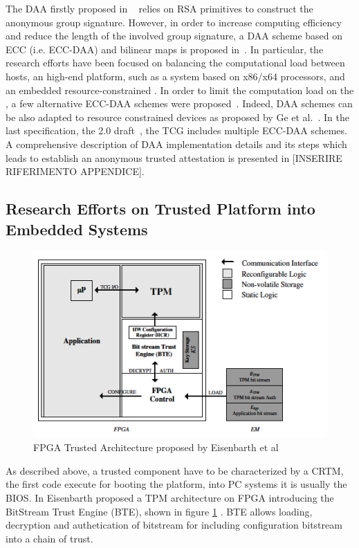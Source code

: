 \documentclass[../tesi.tex]{subfiles}
\begin{document}
The DAA firstly proposed in ~\cite{brickell2004direct} relies on RSA primitives to construct the anonymous group signature. However, in order to increase computing efficiency and reduce the length of the involved group signature, a DAA scheme based on ECC (i.e. ECC-DAA) and bilinear maps is proposed in~\cite{brickell2008new}.
In particular, the research efforts have been focused on balancing the computational load between hosts, an high-end platform, such as a system based on x86/x64 processors, and an embedded resource-constrained \tpm{}.
In order to limit the computation load on the \tpm{}, a few alternative ECC-DAA schemes were proposed~\cite{chen2009daa,brickell2010pairing}.
Indeed, DAA schemes can be also adapted to resource constrained devices as proposed by Ge et al.~\cite{ge2007direct}. 
In the last \tpm{} specification, the 2.0 draft~\cite{tcg2014_2.0}, the TCG includes multiple ECC-DAA schemes.
A comprehensive description of DAA implementation details and its steps which leads to establish an anonymous trusted attestation is presented in [INSERIRE RIFERIMENTO APPENDICE].
 
\subsection{Research Efforts on Trusted Platform into Embedded Systems}
\begin{figure}
\centering
\includegraphics[scale=0.40]{images/eisenbartharchitecture.png}
\caption{FPGA Trusted Architecture proposed by Eisenbarth et al}
\label{fig:eisenbartharchitecture}
\end{figure}
As described above, a trusted component have to be characterized by a CRTM, the first code execute for booting the platform, into PC systems it is usually the BIOS. 
In \cite{eisenbarth2007establishing} Eisenbarth proposed a TPM architecture on FPGA introducing the BitStream Trust Engine (BTE), shown in figure \ref{fig:eisenbartharchitecture} . BTE allows loading, decryption and authetication of bitstream for including configuration bitstream into a chain of trust. 
\end{document}
